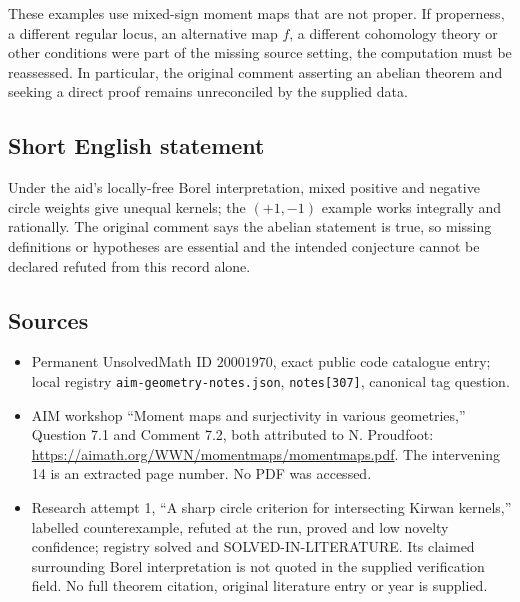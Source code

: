 \documentclass[11pt]{article}
\begin{document}
These examples use mixed-sign moment maps that are not proper. If properness, a different regular locus, an alternative map \(f\), a different cohomology theory or other conditions were part of the missing source setting, the computation must be reassessed. In particular, the original comment asserting an abelian theorem and seeking a direct proof remains unreconciled by the supplied data.
\subsection{Short English statement}
Under the aid's locally-free Borel interpretation, mixed positive and negative circle weights give unequal kernels; the \((+1,-1)\) example works integrally and rationally. The original comment says the abelian statement is true, so missing definitions or hypotheses are essential and the intended conjecture cannot be declared refuted from this record alone.
\subsection{Sources}
\begin{itemize}
\item Permanent UnsolvedMath ID \(20001970\), exact public code catalogue entry; local registry \texttt{aim-geometry-notes.json}, \texttt{notes[307]}, canonical tag question.
\item AIM workshop ``Moment maps and surjectivity in various geometries,'' Question 7.1 and Comment 7.2, both attributed to N. Proudfoot: \url{https://aimath.org/WWN/momentmaps/momentmaps.pdf}. The intervening 14 is an extracted page number. No PDF was accessed.
\item Research attempt 1, ``A sharp circle criterion for intersecting Kirwan kernels,'' labelled counterexample, refuted at the run, proved and low novelty confidence; registry solved and SOLVED-IN-LITERATURE. Its claimed surrounding Borel interpretation is not quoted in the supplied verification field. No full theorem citation, original literature entry or year is supplied.
\end{itemize}
\end{document}
